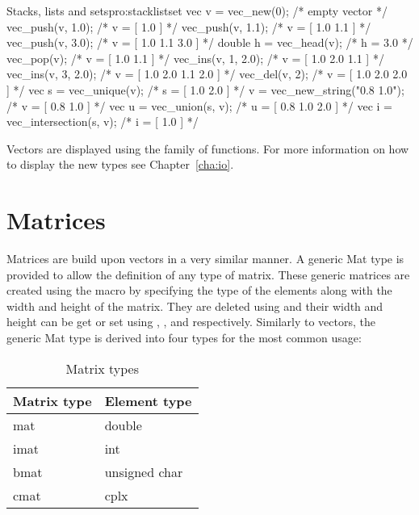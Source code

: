 \begin{program}{Stacks, lists and sets}{pro:stacklistset}
vec v = vec_new(0);             /* empty vector */
vec_push(v, 1.0);               /* v = [ 1.0 ]             */
vec_push(v, 1.1);               /* v = [ 1.0 1.1 ]         */
vec_push(v, 3.0);               /* v = [ 1.0 1.1 3.0 ]     */
double h = vec_head(v);         /* h = 3.0                 */
vec_pop(v);                     /* v = [ 1.0 1.1 ]         */
vec_ins(v, 1, 2.0);             /* v = [ 1.0 2.0 1.1 ]     */
vec_ins(v, 3, 2.0);             /* v = [ 1.0 2.0 1.1 2.0 ] */
vec_del(v, 2);                  /* v = [ 1.0 2.0 2.0 ]     */
vec s = vec_unique(v);          /* s = [ 1.0 2.0 ]         */
v = vec_new_string("0.8 1.0");  /* v = [ 0.8 1.0 ]         */
vec u = vec_union(s, v);        /* u = [ 0.8 1.0 2.0 ]     */
vec i = vec_intersection(s, v); /* i = [ 1.0 ]             */
\end{program}

    Vectors are displayed using the  family of functions. For more
    information on how to display the new types see Chapter~\ref{cha:io}.



\section{Matrices}
\label{sec:matrices}

      Matrices are build upon vectors in a very similar manner. A
      generic Mat type is provided to allow the definition of any type
      of matrix. These generic matrices are created using the
       macro by specifying the type of the
      elements along with the width and height of the matrix. They are
      deleted using  and their width and
      height can be get or set using ,
      ,  and
       respectively. Similarly to vectors,
      the generic Mat type is derived into four types for the most
      common usage:


\begin{table}
\begin{center}
\begin{tabular}{|p{5cm}p{5cm}|}
\hline
       Matrix type & Element type \\
\hline
          mat &  double \\
          imat & int \\
          bmat & unsigned char \\
          cmat & cplx \\
\hline
\end{tabular}
\caption{Matrix types}
\end{center}
\end{table}

